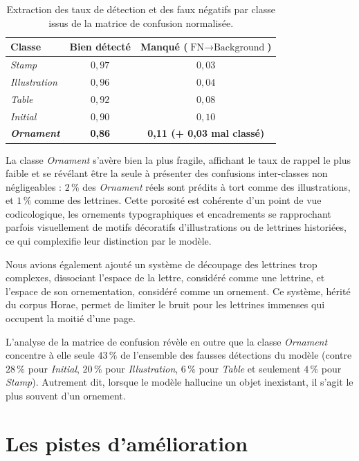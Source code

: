 \begin{table}[h]
	\centering
	\begin{tabular}{lcc}
		\toprule
		\textbf{Classe} & \textbf{Bien détecté} & \textbf{Manqué} ($\text{FN} \to \text{Background}$) \\
		\midrule
		\textit{Stamp} & $0{,}97$ & $0{,}03$ \\
		\textit{Illustration} & $0{,}96$ & $0{,}04$ \\
		\textit{Table} & $0{,}92$ & $0{,}08$ \\
		\textit{Initial} & $0{,}90$ & $0{,}10$ \\
		\textbf{\textit{Ornament}} & \textbf{0{,}86} & \textbf{0{,}11 (+ 0{,}03 mal classé)} \\
		\bottomrule
	\end{tabular}
	\caption{Extraction des taux de détection et des faux négatifs par classe issus de la matrice de confusion normalisée.}
	\label{tab:matrice}
\end{table}

La classe \textit{Ornament} s'avère bien la plus fragile, affichant le taux de rappel le plus faible et se révélant être la seule à présenter des confusions inter-classes non négligeables : $2\,\%$ des \textit{Ornament} réels sont prédits à tort comme des illustrations, et $1\,\%$ comme des lettrines. Cette porosité est cohérente d'un point de vue codicologique, les ornements typographiques et encadrements se rapprochant parfois visuellement de motifs décoratifs d'illustrations ou de lettrines historiées, ce qui complexifie leur distinction par le modèle.

Nous avions également ajouté un système de découpage des lettrines trop complexes, dissociant l'espace de la lettre, considéré comme une lettrine, et l'espace de son ornementation, considéré comme un ornement. Ce système, hérité du corpus Horae, permet de limiter le bruit pour les lettrines immenses qui occupent la moitié d'une page.

L'analyse de la matrice de confusion révèle en outre que la classe \textit{Ornament} concentre à elle seule $43\,\%$ de l'ensemble des fausses détections du modèle (contre $28\,\%$ pour \textit{Initial}, $20\,\%$ pour \textit{Illustration}, $6\,\%$ pour \textit{Table} et seulement $4\,\%$ pour \textit{Stamp}). Autrement dit, lorsque le modèle \og hallucine \fg{} un objet inexistant, il s'agit le plus souvent d'un ornement.

\section{Les pistes d'amélioration}

